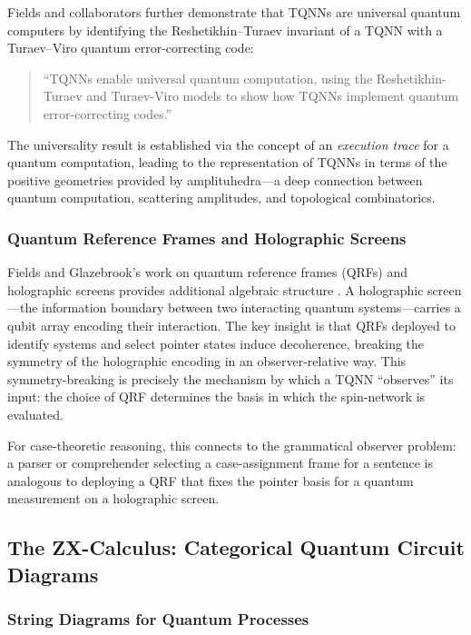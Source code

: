 \documentclass[
]{article}
\numberwithin{equation}{section}
\begin{document}
Fields and collaborators further demonstrate that TQNNs are universal
quantum computers by identifying the Reshetikhin--Turaev invariant of a
TQNN with a Turaev--Viro quantum error-correcting code:

\begin{quote}
``TQNNs enable universal quantum computation, using the
Reshetikhin-Turaev and Turaev-Viro models to show how TQNNs implement
quantum error-correcting codes.'' \citep{fields2025amplituhedra}
\end{quote}

The universality result is established via the concept of an
\emph{execution trace} for a quantum computation, leading to the
representation of TQNNs in terms of the positive geometries provided by
amplituhedra---a deep connection between quantum computation, scattering
amplitudes, and topological combinatorics.

\subsubsection{Quantum Reference Frames and Holographic
Screens}\label{quantum-reference-frames-and-holographic-screens}

Fields and Glazebrook's work on quantum reference frames (QRFs) and
holographic screens provides additional algebraic structure
\citep{fields2021qrf}. A holographic screen---the information boundary
between two interacting quantum systems---carries a qubit array encoding
their interaction. The key insight is that QRFs deployed to identify
systems and select pointer states induce decoherence, breaking the
symmetry of the holographic encoding in an observer-relative way. This
symmetry-breaking is precisely the mechanism by which a TQNN
``observes'' its input: the choice of QRF determines the basis in which
the spin-network is evaluated.

For case-theoretic reasoning, this connects to the grammatical observer
problem: a parser or comprehender selecting a case-assignment frame for
a sentence is analogous to deploying a QRF that fixes the pointer basis
for a quantum measurement on a holographic screen.

\subsection{The ZX-Calculus: Categorical Quantum Circuit
Diagrams}\label{the-zx-calculus-categorical-quantum-circuit-diagrams}

\subsubsection{String Diagrams for Quantum
Processes}\label{string-diagrams-for-quantum-processes}
\end{document}
